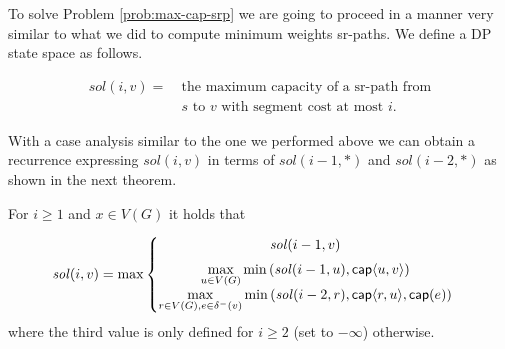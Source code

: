 To solve Problem \ref{prob:max-cap-srp} we are going to proceed in a manner very similar to what we did to compute
minimum weights sr-paths. We define a DP state space as follows.

\begin{align*}
\mathit{sol}(i, v) = \ & \textrm{the maximum capacity of a sr-path from} \\
            \ & \textrm{$s$ to $v$ with segment cost at most $i$.}
\end{align*}

With a case analysis similar to the one we performed above we can obtain a recurrence expressing $\mathit{sol}(i, v)$ in terms
of $\mathit{sol}(i - 1, *)$ and $\mathit{sol}(i - 2, *)$ as shown in the next theorem.


\begin{theorem}
\label{thm:min-cap-srp}
For $i \geq 1$ and $x \in V(G)$ it holds that

\small
\[\mathit{sol}(i, v) = \max \left\{
  \begin{matrix}
    \mathit{sol}(i - 1, v) &  \\[0.2cm]
    \displaystyle \max_{u \in V(G)} \min \left( \mathit{sol}(i - 1, u), \mathsf{cap} \langle u, v \rangle \right) \\[0.2cm]
    \displaystyle \max_{r \in V(G), e \in \delta^-(v)} \min \left( \mathit{sol}(i - 2, r), \mathsf{cap} \langle r, u \rangle, \mathsf{cap}(e) \right) \\
\end{matrix}
  \right.
\]
\normalsize 
where the third value is only defined for $i \geq 2$ (set to $-\infty$) otherwise.
\end{theorem}

